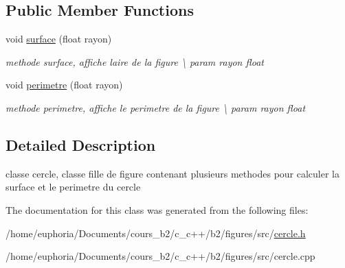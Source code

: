 \subsection*{Public Member Functions}
\begin{DoxyCompactItemize}
\item 
void \hyperlink{classcercle_abb01ec58845bd1340c2f614c5194bcb5}{surface} (float rayon)\hypertarget{classcercle_abb01ec58845bd1340c2f614c5194bcb5}{}\label{classcercle_abb01ec58845bd1340c2f614c5194bcb5}

\begin{DoxyCompactList}\small\item\em methode surface, affiche l\textquotesingle{}aire de la figure \textbackslash{} param rayon float \end{DoxyCompactList}\item 
void \hyperlink{classcercle_a1ffef36ca8e16782d03e44a91639c47a}{perimetre} (float rayon)\hypertarget{classcercle_a1ffef36ca8e16782d03e44a91639c47a}{}\label{classcercle_a1ffef36ca8e16782d03e44a91639c47a}

\begin{DoxyCompactList}\small\item\em methode perimetre, affiche le perimetre de la figure \textbackslash{} param rayon float \end{DoxyCompactList}\end{DoxyCompactItemize}


\subsection{Detailed Description}
classe cercle, classe fille de figure contenant plusieurs methodes pour calculer la surface et le perimetre du cercle 

The documentation for this class was generated from the following files\+:\begin{DoxyCompactItemize}
\item 
/home/euphoria/\+Documents/cours\+\_\+b2/c\+\_\+c++/b2/figures/src/\hyperlink{cercle_8h}{cercle.\+h}\item 
/home/euphoria/\+Documents/cours\+\_\+b2/c\+\_\+c++/b2/figures/src/cercle.\+cpp\end{DoxyCompactItemize}
